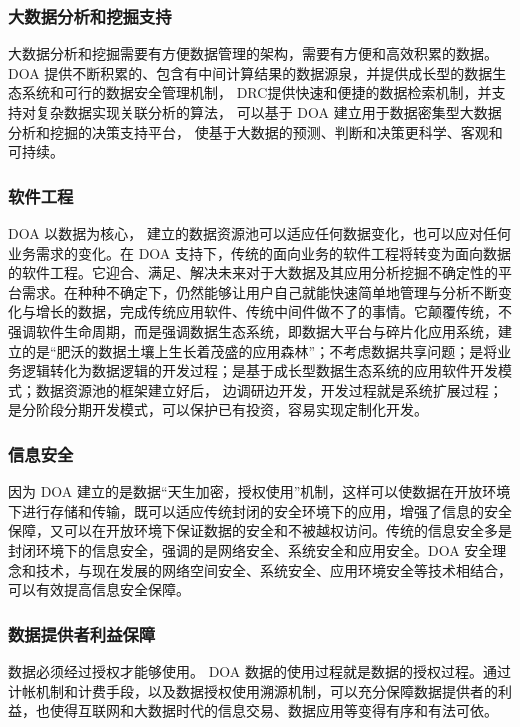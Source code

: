 \documentclass[article]{BJTU-thesis}
\begin{document}
	\subsubsection{大数据分析和挖掘支持}
	大数据分析和挖掘需要有方便数据管理的架构，需要有方便和高效积累的数据\cite{Hey2009The}。 DOA 提供不断积累的、包含有中间计算结果的数据源泉，并提供成长型的数据生态系统和可行的数据安全管理机制， DRC提供快速和便捷的数据检索机制，并支持对复杂数据实现关联分析的算法， 可以基于 DOA 建立用于数据密集型大数据分析和挖掘的决策支持平台， 使基于大数据的预测、判断和决策更科学、客观和可持续\cite{KirkpatrickBig}。
	
	\subsubsection{软件工程}
	DOA 以数据为核心， 建立的数据资源池可以适应任何数据变化，也可以应对任何业务需求的变化。在 DOA 支持下，传统的面向业务的软件工程将转变为面向数据的软件工程\cite{tuzipei.baijia.baidu.com}。它迎合、满足、解决未来对于大数据及其应用分析挖掘不确定性的平台需求。在种种不确定下，仍然能够让用户自己就能快速简单地管理与分析不断变化与增长的数据，完成传统应用软件、传统中间件做不了的事情。它颠覆传统，不强调软件生命周期，而是强调数据生态系统，即数据大平台与碎片化应用系统，建立的是“肥沃的数据土壤上生长着茂盛的应用森林”；不考虑数据共享问题；是将业务逻辑转化为数据逻辑的开发过程；是基于成长型数据生态系统的应用软件开发模式；数据资源池的框架建立好后， 边调研边开发，开发过程就是系统扩展过程；是分阶段分期开发模式，可以保护已有投资，容易实现定制化开发。
	
	\subsubsection{信息安全}
	因为 DOA 建立的是数据“天生加密，授权使用”机制，这样可以使数据在开放环境下进行存储和传输，既可以适应传统封闭的安全环境下的应用，增强了信息的安全保障，又可以在开放环境下保证数据的安全和不被越权访问。传统的信息安全多是封闭环境下的信息安全，强调的是网络安全、系统安全和应用安全\cite{Labrinidis2012Challenges}。DOA 安全理念和技术，与现在发展的网络空间安全、系统安全、应用环境安全等技术相结合，可以有效提高信息安全保障。
	
	\subsubsection{数据提供者利益保障}
	数据必须经过授权才能够使用。 DOA 数据的使用过程就是数据的授权过程。通过计帐机制和计费手段，以及数据授权使用溯源机制，可以充分保障数据提供者的利益，也使得互联网和大数据时代的信息交易、数据应用等变得有序和有法可依。
	
\end{document}
